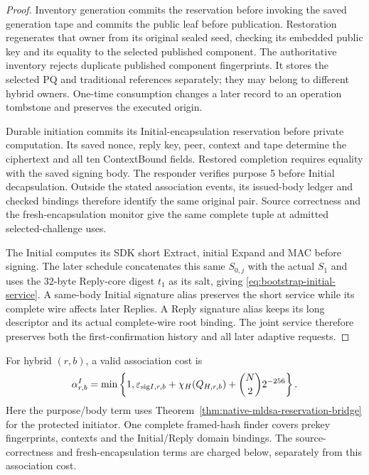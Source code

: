 \begin{proof}
Inventory generation commits the reservation before invoking the saved
generation tape and commits the public leaf before publication. Restoration
regenerates that owner from its original sealed seed, checking its embedded
public key and its equality to the selected published component. The
authoritative inventory rejects duplicate published component fingerprints.
It stores the selected PQ and traditional references separately; they may
belong to different hybrid owners. One-time consumption changes a later
record to an operation tombstone and preserves the executed origin.

Durable initiation commits its Initial-encapsulation reservation before
private computation. Its saved nonce, reply key, peer, context and tape
determine the ciphertext and all ten ContextBound fields. Restored
completion requires equality with the saved signing body. The responder
verifies purpose 5 before Initial decapsulation. Outside the stated
association events, its issued-body ledger and checked bindings therefore
identify the same original pair. Source correctness and the
fresh-encapsulation monitor give the same complete tuple at admitted
selected-challenge uses.

The Initial computes its SDK short Extract, initial Expand and MAC before
signing. The later schedule concatenates this same $S_{0,j}$ with the
actual $S_1$ and uses the 32-byte Reply-core digest $t_1$ as its salt, giving
\eqref{eq:bootstrap-initial-service}. A same-body Initial signature alias
preserves the short service while its complete wire affects later Replies.
A Reply signature alias keeps its long descriptor and its actual
complete-wire root binding. The joint service therefore preserves both
the first-confirmation history and all later adaptive requests.
\end{proof}

For hybrid $(r,b)$, a valid association cost is
\[
 \alpha^{I}_{r,b}=\min\left\{1,
   \varepsilon_{{\rm sig}I,r,b}+\chi_H(Q_{H,r,b})
       +\binom N2 2^{-256}\right\}.
\]
Here the purpose/body term uses
Theorem~\ref{thm:native-mldsa-reservation-bridge} for the protected
initiator. One complete framed-hash finder covers prekey fingerprints,
contexts and the Initial/Reply domain bindings. The source-correctness
and fresh-encapsulation terms are charged below, separately from this
association cost.


